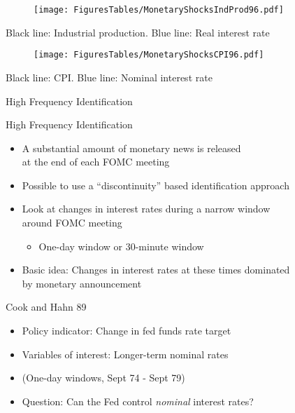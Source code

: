 \documentclass[11pt,aspectratio=169,xcolor={dvipsnames},hyperref={pdftex,pdfpagemode=UseNone,hidelinks,pdfdisplaydoctitle=true},usepdftitle=false]{beamer}
\begin{document}
\begin{frame}
\begin{figure}
\centering
\texttt{[image: FiguresTables/MonetaryShocksIndProd96.pdf]}
\end{figure}
\vspace{-12pt}
{\scriptsize Black line: Industrial production. Blue line: Real interest rate}
\end{frame}


\begin{frame}
\begin{figure}
\centering
\texttt{[image: FiguresTables/MonetaryShocksCPI96.pdf]}
\end{figure}
\vspace{-12pt}
{\scriptsize Black line: CPI. Blue line: Nominal interest rate}
\end{frame}


{  
	\begin{frame}
	\addtocounter{framenumber}{-1}
	\thispagestyle{empty}		
	\begin{center}
		{\Large High Frequency Identification}
	\end{center}	
\end{frame}
}


\begin{frame}{High Frequency Identification}
\begin{itemize}
	\item A substantial amount of monetary news is released \\ at the end of each FOMC meeting
	\item Possible to use a ``discontinuity'' based identification approach
	\item Look at changes in interest rates during a narrow window \\ around FOMC meeting
	\begin{itemize}
		\item One-day window or 30-minute window
	\end{itemize}
	\item Basic idea: Changes in interest rates at these times dominated \\ by monetary announcement
\end{itemize}
\end{frame}


\begin{frame}{Cook and Hahn 89}
\begin{itemize}
\item Policy indicator: Change in fed funds rate target
\item Variables of interest: Longer-term nominal rates
\item[] (One-day windows, Sept 74 - Sept 79) 
\item Question: Can the Fed control \textit{nominal} interest rates?
\end{itemize}
\end{frame}
\end{document}

